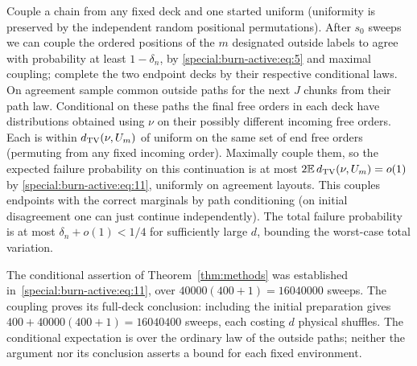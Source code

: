 Couple a chain from any fixed deck and one started uniform (uniformity is preserved by the independent random positional permutations). After \(s_0\) sweeps we can couple the ordered positions of the \(m\) designated outside labels to agree with probability at least \(1-\delta_n\), by \eqref{special:burn-active:eq:5} and maximal coupling; complete the two endpoint decks by their respective conditional laws. On agreement sample common outside paths for the next \(J\) chunks from their path law. Conditional on these paths the final free orders in each deck have distributions obtained using \(\nu\) on their possibly different incoming free orders. Each is within \(d_{\rm TV}(\nu,U_m)\) of uniform on the same set of end free orders (permuting from any fixed incoming order). Maximally couple them, so the expected failure probability on this continuation is at most \(2\mathbb E\,d_{\rm TV}(\nu,U_m)=o(1)\) by \eqref{special:burn-active:eq:11}, uniformly on agreement layouts. This couples endpoints with the correct marginals by path conditioning (on initial disagreement one can just continue independently). The total failure probability is at most \(\delta_n+o(1)<1/4\) for sufficiently large \(d\), bounding the worst-case total variation.

The conditional assertion of Theorem~\ref{thm:methods} was established in~\eqref{special:burn-active:eq:11}, over $40000(400+1)=16040000$ sweeps. The coupling proves its full-deck conclusion: including the initial preparation gives $400+40000(400+1)=16040400$ sweeps, each costing $d$ physical shuffles. The conditional expectation is over the ordinary law of the outside paths; neither the argument nor its conclusion asserts a bound for each fixed environment.
